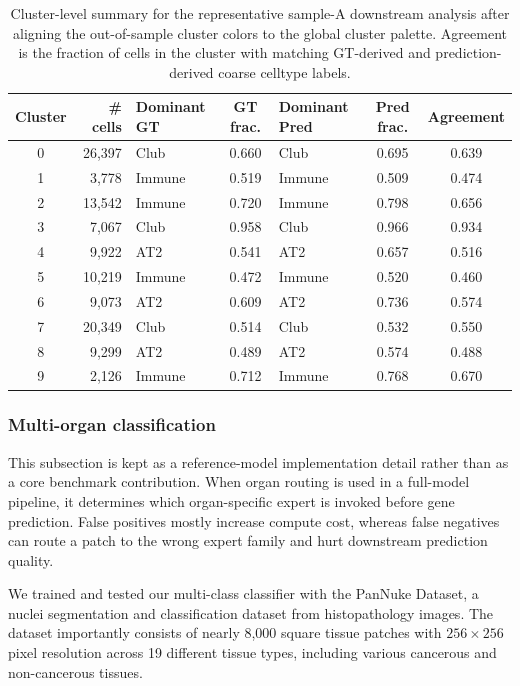 \documentclass[sigconf,review]{acmart}
\begin{document}
\begin{table}[t]
\centering
\scriptsize
\setlength{\tabcolsep}{5pt}
\caption{Cluster-level summary for the representative sample-A downstream analysis after aligning the out-of-sample cluster colors to the global cluster palette. Agreement is the fraction of cells in the cluster with matching GT-derived and prediction-derived coarse celltype labels.}
\label{tab:celltype_cluster_summary}
\begin{tabular}{c r l c l c c}
\toprule
\textbf{Cluster} & \textbf{\# cells} & \textbf{Dominant GT} & \textbf{GT frac.} & \textbf{Dominant Pred} & \textbf{Pred frac.} & \textbf{Agreement} \\
\midrule
0 & 26,397 & Club & 0.660 & Club & 0.695 & 0.639 \\
1 & 3,778 & Immune & 0.519 & Immune & 0.509 & 0.474 \\
2 & 13,542 & Immune & 0.720 & Immune & 0.798 & 0.656 \\
3 & 7,067 & Club & 0.958 & Club & 0.966 & 0.934 \\
4 & 9,922 & AT2 & 0.541 & AT2 & 0.657 & 0.516 \\
5 & 10,219 & Immune & 0.472 & Immune & 0.520 & 0.460 \\
6 & 9,073 & AT2 & 0.609 & AT2 & 0.736 & 0.574 \\
7 & 20,349 & Club & 0.514 & Club & 0.532 & 0.550 \\
8 & 9,299 & AT2 & 0.489 & AT2 & 0.574 & 0.488 \\
9 & 2,126 & Immune & 0.712 & Immune & 0.768 & 0.670 \\
\bottomrule
\end{tabular}
\end{table}

\subsubsection{Multi-organ classification}
\label{sec:multi_organ_classification}

\noindent
This subsection is kept as a reference-model implementation detail rather than as a core benchmark contribution. When organ routing is used in a full-model pipeline, it determines which organ-specific expert is invoked before gene prediction. False positives mostly increase compute cost, whereas false negatives can route a patch to the wrong expert family and hurt downstream prediction quality.

We trained and tested our multi-class classifier with the PanNuke Dataset, a nuclei segmentation and classification dataset from histopathology images. The dataset importantly consists of nearly 8,000 square tissue patches with $256\times256$ pixel resolution across 19 different tissue types, including various cancerous and non-cancerous tissues.
\end{document}
